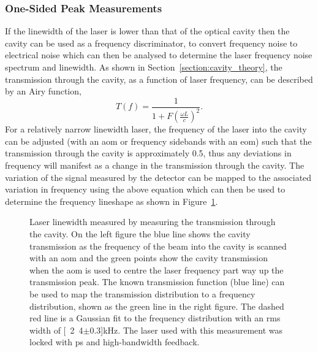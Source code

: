 \subsubsection{One-Sided Peak Measurements}\label{section:one_sided_peak}

If the linewidth of the laser is lower than that of the optical cavity then the cavity can be used as a frequency discriminator, to convert frequency noise to electrical noise which can then be analysed to determine the laser frequency noise spectrum and linewidth.
As shown in Section~\ref{section:cavity_theory}, the transmission through the cavity, as a function of laser frequency, can be described by an Airy function,
\begin{equation}
T(f) = \frac{1}{1+F\left(\frac{\omega L}{c}\right)^2}.
\end{equation}
For a relatively narrow linewidth laser, the frequency of the laser into the cavity can be adjusted (with an \gls{aom} or frequency sidebands with an \gls{eom}) such that the transmission through the cavity is approximately 0.5, thus any deviations in frequency will manifest as a change in the transmission through the cavity.
The variation of the signal measured by the detector can be mapped to the associated variation in frequency using the above equation which can then be used to determine the frequency lineshape as shown in Figure~\ref{figure:side_of_peak}.

\begin{figure}
\center

\caption[Laser linewidth measured by examining cavity transmission on one side of the cavity transmission peak.]{Laser linewidth measured by measuring the transmission through the cavity. On the left figure the blue line shows the cavity transmission as the frequency of the beam into the cavity is scanned with an \gls{aom} and the green points show the cavity transmission when the \gls{aom} is used to centre the laser frequency part way up the transmission peak.
The known transmission function (blue line) can be used to map the transmission distribution to a frequency distribution, shown as the green line in the right figure.
The dashed red line is a Gaussian fit to the frequency distribution with an \gls{rms} width of \unit[2.4$\pm$0.3]{kHz}.
The laser used with this measurement was locked with \gls{ps} and high-bandwidth feedback.}
\label{figure:side_of_peak}
\end{figure}

